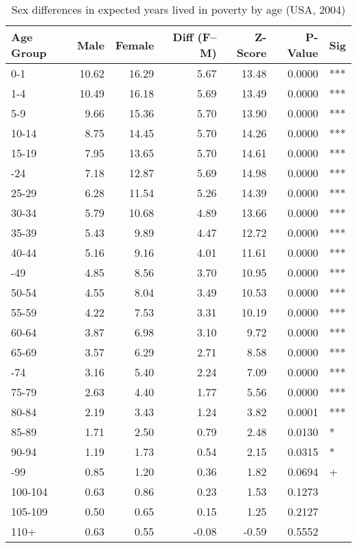 \begin{table}

\caption{Sex differences in expected years lived in poverty by age (USA, 2004)}
\centering
\begin{tabular}[t]{lrrrrrl}
\toprule
Age Group & Male & Female & Diff (F--M) & Z-Score & P-Value & Sig\\
\midrule
0-1 & 10.62 & 16.29 & 5.67 & 13.48 & 0.0000 & ***\\
1-4 & 10.49 & 16.18 & 5.69 & 13.49 & 0.0000 & ***\\
5-9 & 9.66 & 15.36 & 5.70 & 13.90 & 0.0000 & ***\\
10-14 & 8.75 & 14.45 & 5.70 & 14.26 & 0.0000 & ***\\
15-19 & 7.95 & 13.65 & 5.70 & 14.61 & 0.0000 & ***\\
\addlinespace
20-24 & 7.18 & 12.87 & 5.69 & 14.98 & 0.0000 & ***\\
25-29 & 6.28 & 11.54 & 5.26 & 14.39 & 0.0000 & ***\\
30-34 & 5.79 & 10.68 & 4.89 & 13.66 & 0.0000 & ***\\
35-39 & 5.43 & 9.89 & 4.47 & 12.72 & 0.0000 & ***\\
40-44 & 5.16 & 9.16 & 4.01 & 11.61 & 0.0000 & ***\\
\addlinespace
45-49 & 4.85 & 8.56 & 3.70 & 10.95 & 0.0000 & ***\\
50-54 & 4.55 & 8.04 & 3.49 & 10.53 & 0.0000 & ***\\
55-59 & 4.22 & 7.53 & 3.31 & 10.19 & 0.0000 & ***\\
60-64 & 3.87 & 6.98 & 3.10 & 9.72 & 0.0000 & ***\\
65-69 & 3.57 & 6.29 & 2.71 & 8.58 & 0.0000 & ***\\
\addlinespace
70-74 & 3.16 & 5.40 & 2.24 & 7.09 & 0.0000 & ***\\
75-79 & 2.63 & 4.40 & 1.77 & 5.56 & 0.0000 & ***\\
80-84 & 2.19 & 3.43 & 1.24 & 3.82 & 0.0001 & ***\\
85-89 & 1.71 & 2.50 & 0.79 & 2.48 & 0.0130 & *\\
90-94 & 1.19 & 1.73 & 0.54 & 2.15 & 0.0315 & *\\
\addlinespace
95-99 & 0.85 & 1.20 & 0.36 & 1.82 & 0.0694 & +\\
100-104 & 0.63 & 0.86 & 0.23 & 1.53 & 0.1273 & \\
105-109 & 0.50 & 0.65 & 0.15 & 1.25 & 0.2127 & \\
110+ & 0.63 & 0.55 & -0.08 & -0.59 & 0.5552 & \\
\bottomrule
\end{tabular}
\end{table}
